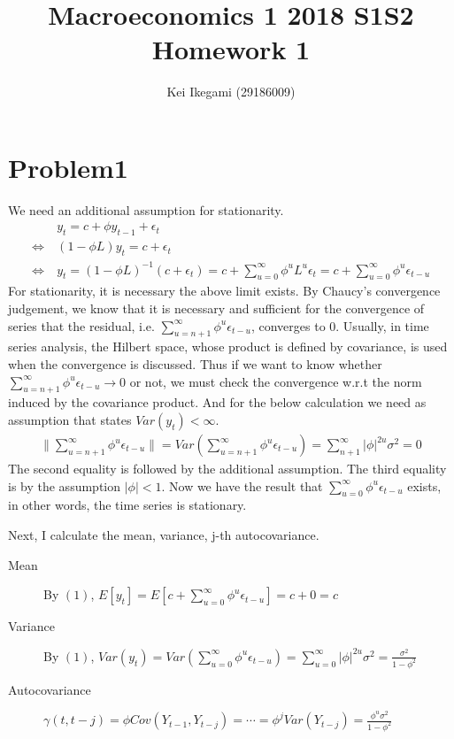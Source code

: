 \documentclass{article}
\begin{document}
\title{Macroeconomics 1 2018 S1S2 \\ 
Homework 1}
\author{Kei Ikegami (29186009)}
\maketitle

\section{Problem1}
 We need an additional assumption for stationarity.
 \begin{align}
 	&y_t = c + \phi y_{t-1} + \epsilon_t \nonumber \\
	\Leftrightarrow\ &(1-\phi L)y_t = c + \epsilon_t \nonumber \\
	\Leftrightarrow\ & y_t = (1-\phi L)^{-1} (c + \epsilon_t) = c + \sum_{u = 0}^{\infty} \phi^u L^u \epsilon_t = c + \sum_{u = 0}^{\infty} \phi^u \epsilon_{t-u}
 \end{align}
 For stationarity, it is necessary the above limit exists.  By Chaucy's convergence judgement, we know that it is necessary and sufficient for the convergence of series that the residual, i.e. $\sum_{u = n+1}^{\infty} \phi^u \epsilon_{t-u}$, converges to $0$. Usually, in time series analysis, the Hilbert space, whose product is defined by covariance, is used when the convergence is discussed. Thus if we want to know whether $\sum_{u = n+1}^{\infty} \phi^u \epsilon_{t-u} \to 0$ or not, we must check the convergence w.r.t the norm induced by the covariance product. And for the below calculation we need as assumption that states $Var(y_t) < \infty$. 
\begin{align*}
	\| \sum_{u = n+1}^{\infty} \phi^u \epsilon_{t-u} \| = Var(\sum_{u = n+1}^{\infty} \phi^u \epsilon_{t-u}) = \sum_{n+1}^{\infty} |\phi|^{2u}\sigma^2 = 0
\end{align*}
The second equality is followed by the additional assumption. The third equality is by the assumption $|\phi| < 1$. Now we have the result that $\sum_{u = 0}^{\infty} \phi^u \epsilon_{t-u}$ exists, in other words, the time series is stationary.

Next, I calculate the mean, variance, j-th autocovariance.
\begin{description}
	\item[Mean] By $(1)$, $E[y_t] = E\left[ c + \sum_{u = 0}^{\infty} \phi^u \epsilon_{t-u} \right] = c + 0 = c$
	\item[Variance] By $(1)$, $Var(y_t) = Var\left( \sum_{u = 0}^{\infty} \phi^u \epsilon_{t-u} \right) = \sum_{u=0}^{\infty} |\phi|^{2u} \sigma^2 = \frac{\sigma^2}{1-\phi^2}$
	\item[Autocovariance] $\gamma(t,t-j) = \phi Cov(Y_{t-1}, Y_{t-j}) = \cdots = \phi^j Var(Y_{t-j}) = \frac{\phi^u \sigma^2}{1-\phi^2}$
\end{description}
\end{document}
